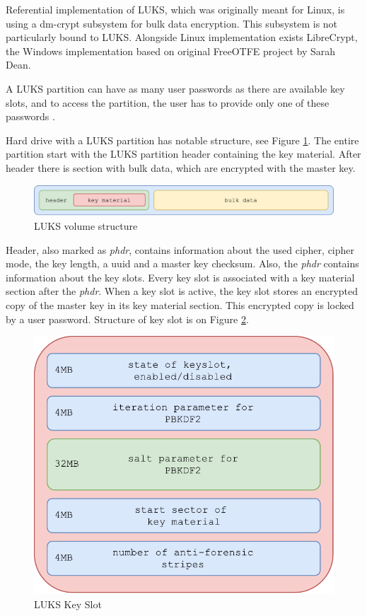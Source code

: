 Referential implementation of LUKS, which was originally meant for Linux, is using a dm-crypt subsystem for bulk data encryption.
This subsystem is not particularly bound to LUKS.
Alongside Linux implementation exists LibreCrypt, the Windows implementation based on original FreeOTFE \cite{FreeOTFE} project by Sarah Dean.

A LUKS partition can have as many user passwords as there are available key slots, and to access the partition, the user has to provide only one of these passwords \cite{LUKS}.

Hard drive with a LUKS partition has notable structure, see Figure \ref{fig:luksvol}.
The entire partition start with the LUKS partition header containing the key material.
After header there is section with bulk data, which are encrypted with the master key.

\begin{figure}[h]
    \centering
    \includegraphics[scale=0.7]{figures/LUKSdrive.pdf}
    \caption{LUKS volume structure}
    \label{fig:luksvol}
\end{figure}

Header, also marked as {\it phdr}, contains information about the used cipher, cipher mode, the key length, a uuid and a master key checksum.
Also, the {\it phdr} contains information about the key slots.
Every key slot is associated with a key material section after the {\it phdr}.
When a key slot is active, the key slot stores an encrypted copy of the master key in its key material section.
This encrypted copy is locked by a user password.
Structure of key slot is on Figure \ref{fig:luksslot}.

\begin{figure}[h]
    \centering
    \includegraphics[scale=0.6]{figures/LUKSkeyslot.pdf}
    \caption{LUKS Key Slot}
    \label{fig:luksslot}
\end{figure}

